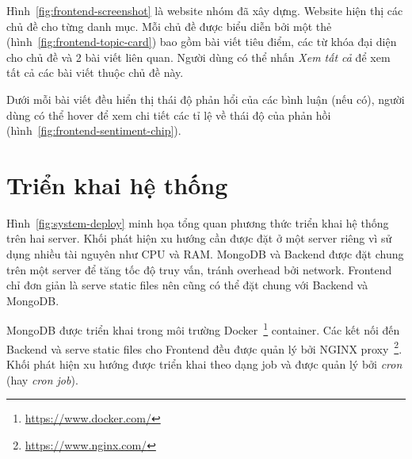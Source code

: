 Hình~\ref{fig:frontend-screenshot} là website nhóm đã xây dựng. Website hiện thị các chủ đề cho từng danh mục. Mỗi chủ đề được biểu diễn bởi một thẻ (hình~\ref{fig:frontend-topic-card}) bao gồm bài viết tiêu điểm, các từ khóa đại diện cho chủ đề và 2 bài viết liên quan. Người dùng có thể nhấn \textit{Xem tất cả} để xem tất cả các bài viết thuộc chủ đề này.



Dưới mỗi bài viết đều hiển thị thái độ phản hổi của các bình luận (nếu có), người dùng có thể hover để xem chi tiết các tỉ lệ về thái độ của phản hồi (hình~\ref{fig:frontend-sentiment-chip}).


\section{Triển khai hệ thống}
Hình~\ref{fig:system-deploy} minh họa tổng quan phương thức triển khai hệ thống trên hai server. Khối phát hiện xu hướng cần được đặt ở một server riêng vì sử dụng nhiều tài nguyên như CPU và RAM. MongoDB và Backend được đặt chung trên một server để tăng tốc độ truy vấn, tránh overhead bởi network. Frontend chỉ đơn giản là serve static files nên cũng có thể đặt chung với Backend và MongoDB.

MongoDB được triển khai trong môi trường Docker~\footnote{\url{https://www.docker.com/}} container. Các kết nối đến Backend và serve static files cho Frontend đều được quản lý bởi NGINX proxy~\footnote{\url{https://www.nginx.com/}}. Khối phát hiện xu hướng được triển khai theo dạng job và được quản lý bởi \textit{cron} (hay \textit{cron job}).

